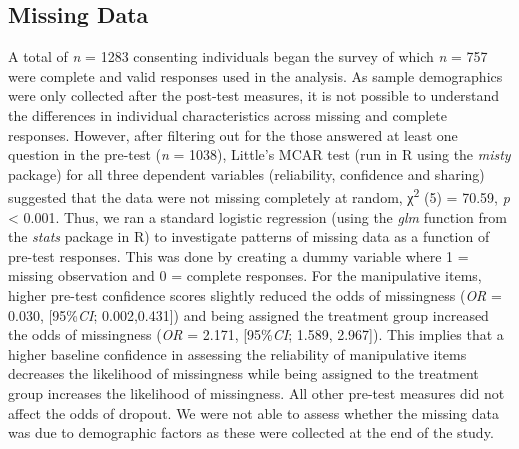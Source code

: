 \documentclass[empirical, authordate]{jote-new-article}
\begin{document}
\subsection{Missing Data}
A total of \emph{n} = 1283 consenting individuals began the survey of which \emph{n} = 757 were complete and valid responses used in the analysis. As sample demographics were only collected after the post-test measures, it is not possible to understand the differences in individual characteristics across missing and complete responses. However, after filtering out for the those answered at least one question in the pre-test (\emph{n} = 1038), Little's MCAR test (run in R using the \emph{misty }package) for all three dependent variables (reliability, confidence and sharing) suggested that the data were not missing completely at random, χ\textsuperscript{2} (5) = 70.59, \emph{p }< 0.001. Thus, we ran a standard logistic regression (using the \emph{glm }function from the \emph{stats} package in R) to investigate patterns of missing data as a function of pre-test responses. This was done by creating a dummy variable where 1 = missing observation and 0 = complete responses. For the manipulative items, higher pre-test confidence scores slightly reduced the odds of missingness (\emph{OR} = 0.030, [95\%\emph{CI}; 0.002,0.431]) and being assigned the treatment group increased the odds of missingness (\emph{OR} = 2.171, [95\%\emph{CI}; 1.589, 2.967]). This implies that a higher baseline confidence in assessing the reliability of manipulative items decreases the likelihood of missingness while being assigned to the treatment group increases the likelihood of missingness. All other pre-test measures did not affect the odds of dropout. We were not able to assess whether the missing data was due to demographic factors as these were collected at the end of the study.
\end{document}
